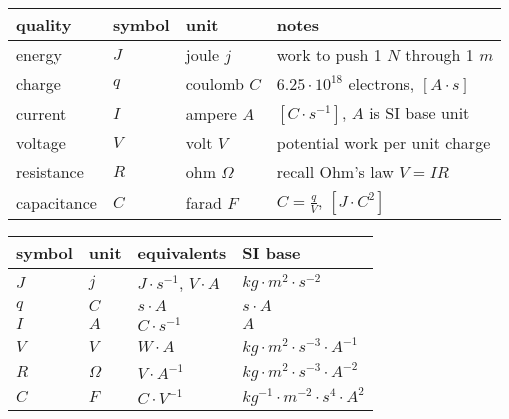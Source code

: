 \begin{table*}[htp!]
    \begin{center}

    \begin{tabular}{llll}
        \hline
        quality & symbol & unit  & notes \\
        \hline
        energy     & $J$ & joule   $j$  & work to push 1 $N$ through 1 $m$ \\
        charge     & $q$ & coulomb $C$  & $6.25\cdot10^{18}$ electrons, $[A\cdot s]$ \\
        current    & $I$ & ampere  $A$  & $[C\cdot s^{-1}]$, $A$ is SI base unit\\
        voltage    & $V$ & volt    $V$  & potential work per unit charge \\
        resistance & $R$ & ohm $\Omega$ & recall Ohm's law $V=IR$ \\
        capacitance& $C$ & farad   $F$  & $C=\frac{q}{V}$, $[J\cdot C^{2}]$\\
        \hline
    \end{tabular}

    \begin{tabular}{llll}
        \hline
        symbol & unit & equivalents & SI base \\
        \hline
        $J$    & $j$      &  $J\cdot s^{-1}$, $V\cdot A$ &
            $kg\cdot m^{2}\cdot s^{-2}$ \\

        $q$    & $C$      & $s\cdot A$ &
            $s\cdot A$ \\

        $I$    & $A$  & $C\cdot s^{-1}$ &
            $A$ \\

        $V$    & $V$      & $W\cdot A$ &
            $kg\cdot m^{2}\cdot s^{-3}\cdot A^{-1}$ \\

        $R$    & $\Omega$ & $V\cdot A^{-1}$ &
            $kg\cdot m^{2}\cdot s^{-3}\cdot A^{-2}$ \\

        $C$    & $F$      & $C\cdot V^{-1}$  &
            $kg^{-1}\cdot m^{-2}\cdot s^{4}\cdot A^{2}$ \\
        \hline
    \end{tabular}

    \end{center}
    \caption{Symbols and quantities.}
\end{table*}


